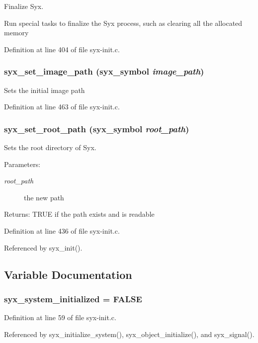 Finalize Syx.

Run special tasks to finalize the Syx process, such as clearing all the allocated memory 

Definition at line 404 of file syx-init.c.\hypertarget{syx-init_8c_40ee7fef8570d7cf610390faa9b1b0b1}{
\subsubsection{ syx\_\-set\_\-image\_\-path ({\bf syx\_\-symbol} {\em image\_\-path})}}
\label{syx-init_8c_40ee7fef8570d7cf610390faa9b1b0b1}


Sets the initial image path 

Definition at line 463 of file syx-init.c.\hypertarget{syx-init_8c_ff01e7545e5741ba55b0584816243b05}{
\subsubsection{ syx\_\-set\_\-root\_\-path ({\bf syx\_\-symbol} {\em root\_\-path})}}
\label{syx-init_8c_ff01e7545e5741ba55b0584816243b05}


Sets the root directory of Syx.

\begin{Desc}
\item[Parameters:]
\begin{description}
\item[{\em root\_\-path}]the new path \end{description}
\end{Desc}
\begin{Desc}
\item[Returns:]TRUE if the path exists and is readable \end{Desc}


Definition at line 436 of file syx-init.c.

Referenced by syx\_\-init().

\subsection{Variable Documentation}
\hypertarget{syx-init_8c_a635a8b40fe35e17b7d2441eb9c11623}{
\subsubsection{ {\bf syx\_\-system\_\-initialized} = FALSE}}
\label{syx-init_8c_a635a8b40fe35e17b7d2441eb9c11623}




Definition at line 59 of file syx-init.c.

Referenced by syx\_\-initialize\_\-system(), syx\_\-object\_\-initialize(), and syx\_\-signal().